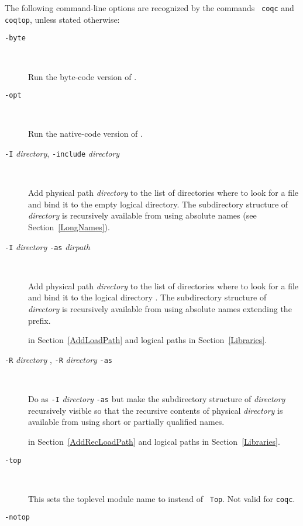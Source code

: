 The following command-line options are recognized by the commands {\tt
  coqc} and {\tt coqtop}, unless stated otherwise:

\begin{description}
\item[{\tt -byte}]\ 

  Run the byte-code version of \Coq{}.

\item[{\tt -opt}]\ 

  Run the native-code version of \Coq{}.

\item[{\tt -I} {\em directory}, {\tt -include} {\em directory}]\ 

  Add physical path {\em directory} to the list of directories where to
  look for a file and bind it to the empty logical directory. The
  subdirectory structure of {\em directory} is recursively available
  from {\Coq} using absolute names (see Section~\ref{LongNames}).

\item[{\tt -I} {\em directory} {\tt -as} {\em dirpath}]\ 

  Add physical path {\em directory} to the list of directories where to
  look for a file and bind it to the logical directory {\dirpath}.  The
  subdirectory structure of {\em directory} is recursively available
  from {\Coq} using absolute names extending the {\dirpath} prefix.

   in Section~\ref{AddLoadPath} and logical
  paths in Section~\ref{Libraries}.

\item[{\tt -R} {\em directory} {\dirpath}, {\tt -R} {\em directory} {\tt -as} {\dirpath}]\

  Do as {\tt -I} {\em directory} {\tt -as} {\dirpath} but make the
  subdirectory structure of {\em directory} recursively visible so
  that the recursive contents of physical {\em directory} is available
  from {\Coq} using short or partially qualified names.
  
   in Section~\ref{AddRecLoadPath} and logical
  paths in Section~\ref{Libraries}.

\item[{\tt -top} {\dirpath}]\ 

  This sets the toplevel module name to {\dirpath} instead of {\tt
  Top}. Not valid for {\tt coqc}.

\item[{\tt -notop} {\dirpath}]\ 


\end{description}
